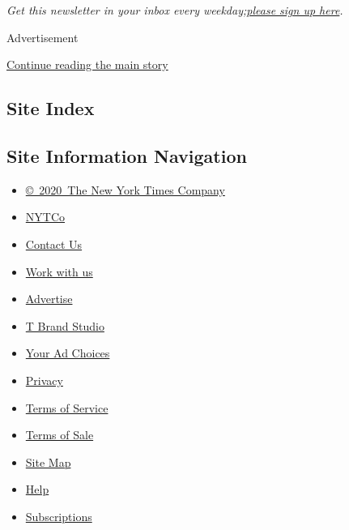 \emph{Get this newsletter in your inbox every
weekday;}\href{https://www.nytimes3xbfgragh.onion/newsletters/signup/OT}{\emph{please
sign up here}}\emph{.}

Advertisement

\protect\hyperlink{after-bottom}{Continue reading the main story}

\hypertarget{site-index}{%
\subsection{Site Index}\label{site-index}}

\hypertarget{site-information-navigation}{%
\subsection{Site Information
Navigation}\label{site-information-navigation}}

\begin{itemize}
\tightlist
\item
  \href{https://help.nytimes3xbfgragh.onion/hc/en-us/articles/115014792127-Copyright-notice}{©~2020~The
  New York Times Company}
\end{itemize}

\begin{itemize}
\tightlist
\item
  \href{https://www.nytco.com/}{NYTCo}
\item
  \href{https://help.nytimes3xbfgragh.onion/hc/en-us/articles/115015385887-Contact-Us}{Contact
  Us}
\item
  \href{https://www.nytco.com/careers/}{Work with us}
\item
  \href{https://nytmediakit.com/}{Advertise}
\item
  \href{http://www.tbrandstudio.com/}{T Brand Studio}
\item
  \href{https://www.nytimes3xbfgragh.onion/privacy/cookie-policy\#how-do-i-manage-trackers}{Your
  Ad Choices}
\item
  \href{https://www.nytimes3xbfgragh.onion/privacy}{Privacy}
\item
  \href{https://help.nytimes3xbfgragh.onion/hc/en-us/articles/115014893428-Terms-of-service}{Terms
  of Service}
\item
  \href{https://help.nytimes3xbfgragh.onion/hc/en-us/articles/115014893968-Terms-of-sale}{Terms
  of Sale}
\item
  \href{https://spiderbites.nytimes3xbfgragh.onion}{Site Map}
\item
  \href{https://help.nytimes3xbfgragh.onion/hc/en-us}{Help}
\item
  \href{https://www.nytimes3xbfgragh.onion/subscription?campaignId=37WXW}{Subscriptions}
\end{itemize}
